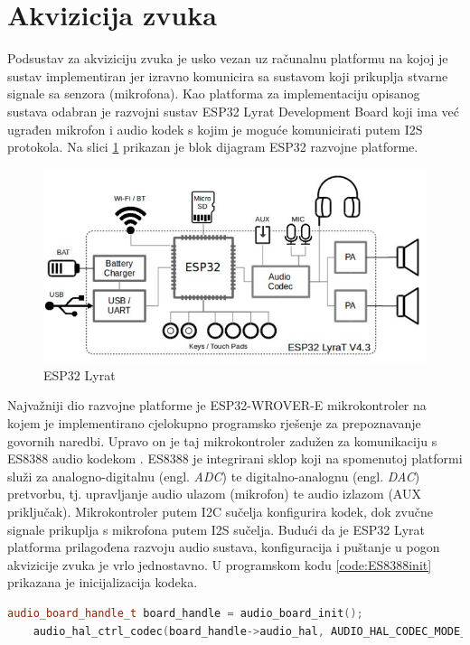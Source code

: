 \section{Akvizicija zvuka}
\label{sec:acq}

Podsustav za akviziciju zvuka je usko vezan uz računalnu platformu na kojoj
je sustav implementiran jer izravno komunicira
sa sustavom koji prikuplja stvarne signale sa senzora (mikrofona).
Kao platforma za implementaciju opisanog sustava odabran je razvojni sustav ESP32 Lyrat Development Board \cite{lyrat} koji ima već ugrađen mikrofon i audio kodek
s kojim je moguće komunicirati putem I2S protokola. Na slici
\ref{pic:esp} prikazan je blok dijagram ESP32 razvojne platforme.

\begin{figure}[htb]
    \centering
    \includegraphics[width=0.75\linewidth]{Chapters/struktura_sustava/akvizicija/lyrat.png} 
    \caption{ESP32 Lyrat \cite{lyrat}}
    \label{pic:esp}
\end{figure}

Najvažniji dio razvojne platforme je ESP32-WROVER-E mikrokontroler
na kojem je implementirano cjelokupno programsko rješenje za prepoznavanje govornih naredbi. Upravo on je taj mikrokontroler zadužen za komunikaciju s ES8388 
audio kodekom \cite{es8388}. ES8388 je integrirani sklop koji na spomenutoj
platformi služi za analogno-digitalnu (engl. \textit{ADC}) te digitalno-analognu 
(engl. \textit{DAC}) pretvorbu, tj. upravljanje audio ulazom (mikrofon) te audio
izlazom (AUX priključak). Mikrokontroler putem I2C sučelja konfigurira kodek,
dok zvučne signale prikuplja s mikrofona putem I2S sučelja. Budući da je ESP32 Lyrat
platforma prilagođena razvoju audio sustava, konfiguracija i puštanje u pogon
akvizicije zvuka je vrlo jednostavno. U programskom kodu \ref{code:ES8388init}
prikazana je inicijalizacija kodeka.

\begin{lstlisting}[language=C++, caption={Inicijalizacija kodeka}, label={code:ES8388init}]
    audio_board_handle_t board_handle = audio_board_init();
    audio_hal_ctrl_codec(board_handle->audio_hal, AUDIO_HAL_CODEC_MODE_ENCODE, AUDIO_HAL_CTRL_START);
\end{lstlisting}

